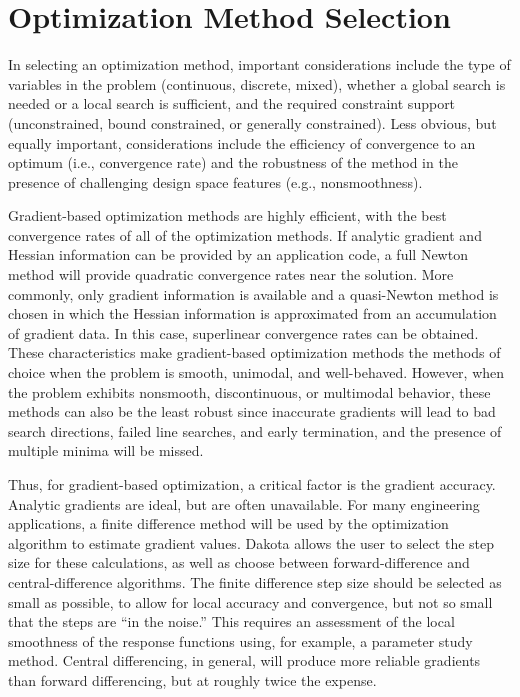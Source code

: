 \section{Optimization Method Selection}\label{usage:selection}

In selecting an optimization method, important considerations include
the type of variables in the problem (continuous, discrete, mixed),
whether a global search is needed or a local search is sufficient, and
the required constraint support (unconstrained, bound constrained,
or generally constrained). Less obvious, but equally important,
considerations include the efficiency of convergence to an optimum
(i.e., convergence rate) and the robustness of the method in the
presence of challenging design space features (e.g., nonsmoothness).

Gradient-based optimization methods are highly efficient, with the
best convergence rates of all of the optimization methods. If analytic
gradient and Hessian information can be provided by an application
code, a full Newton method will provide quadratic convergence rates
near the solution. More commonly, only gradient information is
available and a quasi-Newton method is chosen in which the Hessian
information is approximated from an accumulation of gradient data. In
this case, superlinear convergence rates can be obtained. These
characteristics make gradient-based optimization methods the methods
of choice when the problem is smooth, unimodal, and
well-behaved. However, when the problem exhibits nonsmooth,
discontinuous, or multimodal behavior, these methods can also be the
least robust since inaccurate gradients will lead to bad search
directions, failed line searches, and early termination, and the
presence of multiple minima will be missed.

Thus, for gradient-based optimization, a critical factor is the
gradient accuracy. Analytic gradients are ideal, but are often
unavailable. For many engineering applications, a finite difference
method will be used by the optimization algorithm to estimate gradient
values. Dakota allows the user to select the step size for these
calculations, as well as choose between forward-difference and
central-difference algorithms. The finite difference step size should
be selected as small as possible, to allow for local accuracy and
convergence, but not so small that the steps are ``in the noise.'' 
This requires an assessment of the local smoothness of the response
functions using, for example, a parameter study method.  Central
differencing, in general, will produce more reliable gradients than
forward differencing, but at roughly twice the expense.

